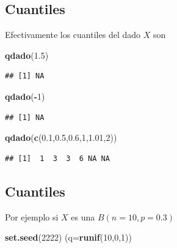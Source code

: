 \documentclass[]{book}
\newenvironment{Shaded}{\begin{snugshade}}{\end{snugshade}}
\newcommand{\DataTypeTok}[1]{\textcolor[rgb]{0.13,0.29,0.53}{#1}}
\newcommand{\DecValTok}[1]{\textcolor[rgb]{0.00,0.00,0.81}{#1}}
\newcommand{\FloatTok}[1]{\textcolor[rgb]{0.00,0.00,0.81}{#1}}
\newcommand{\KeywordTok}[1]{\textcolor[rgb]{0.13,0.29,0.53}{\textbf{#1}}}
\newcommand{\NormalTok}[1]{#1}
\newcommand{\OperatorTok}[1]{\textcolor[rgb]{0.81,0.36,0.00}{\textbf{#1}}}
\begin{document}
\hypertarget{cuantiles-8}{%
\subsection{Cuantiles}\label{cuantiles-8}}

Efectivamente los cuantiles del dado \(X\) son

\begin{Shaded}
\begin{Highlighting}[]
\KeywordTok{qdado}\NormalTok{(}\FloatTok{1.5}\NormalTok{)}
\end{Highlighting}
\end{Shaded}

\begin{verbatim}
## [1] NA
\end{verbatim}

\begin{Shaded}
\begin{Highlighting}[]
\KeywordTok{qdado}\NormalTok{(}\OperatorTok{-}\DecValTok{1}\NormalTok{)}
\end{Highlighting}
\end{Shaded}

\begin{verbatim}
## [1] NA
\end{verbatim}

\begin{Shaded}
\begin{Highlighting}[]
\KeywordTok{qdado}\NormalTok{(}\KeywordTok{c}\NormalTok{(}\FloatTok{0.1}\NormalTok{,}\FloatTok{0.5}\NormalTok{,}\FloatTok{0.6}\NormalTok{,}\DecValTok{1}\NormalTok{,}\FloatTok{1.01}\NormalTok{,}\DecValTok{2}\NormalTok{))}
\end{Highlighting}
\end{Shaded}

\begin{verbatim}
## [1]  1  3  3  6 NA NA
\end{verbatim}

\hypertarget{cuantiles-9}{%
\subsection{Cuantiles}\label{cuantiles-9}}

Por ejemplo si \(X\) es una \(B(n=10,p=0.3)\)

\begin{Shaded}
\begin{Highlighting}[]
\KeywordTok{set.seed}\NormalTok{(}\DecValTok{2222}\NormalTok{)}
\NormalTok{(}\DataTypeTok{q=}\KeywordTok{runif}\NormalTok{(}\DecValTok{10}\NormalTok{,}\DecValTok{0}\NormalTok{,}\DecValTok{1}\NormalTok{))}
\end{Highlighting}
\end{Shaded}
\end{document}
